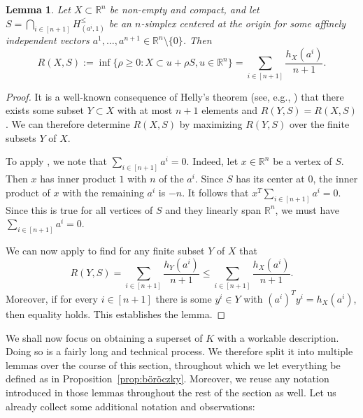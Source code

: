 \documentclass{amsart}
\newtheorem{lemma}[theorem]{Lemma}
\newcommand\R{\mathbb{R}}
\begin{document}
\begin{lemma}\label{lem:simplex_circumradius}
Let $X \subset \R^n$ be non-empty and compact,
and let $S = \bigcap_{i \in [n+1]} H_{(a^i,1)}^\leq$
be an $n$-simplex centered at the origin
for some affinely independent vectors $a^1, \dots, a^{n+1} \in \R^n \setminus \{0\}$.
Then
\[
    R(X,S)
    := \inf \{ \rho \geq 0 : X \subset u + \rho S, u \in \R^n \}
    = \sum_{i \in [n+1]} \frac{h_X(a^i)}{n+1}.
\]
\end{lemma}
\begin{proof}
It is a well-known consequence of Helly's theorem (see, e.g., \cite[Lemma~$2.2$]{2013:BrandenbergKönig}) that there exists some subset $Y \subset X$ with at most $n+1$ elements and $R(Y,S) = R(X,S)$.
We can therefore determine $R(X,S)$ by maximizing $R(Y,S)$ over the finite subsets $Y$ of $X$.

To apply \cite[Proposition~$6$]{2026:BryantTupper}, we note that $\sum_{i \in [n+1]} a^i = 0$.
Indeed, let $x \in \R^n$ be a vertex of $S$.
Then $x$ has inner product $1$ with $n$ of the $a^i$.
Since $S$ has its center at $0$,
the inner product of $x$ with the remaining $a^i$ is $-n$.
It follows that $x^T \sum_{i \in [n+1]} a^i = 0$.
Since this is true for all vertices of $S$ and they linearly span $\R^n$,
we must have $\sum_{i \in [n+1]} a^i = 0$.

We can now apply \cite[Proposition~$6$]{2026:BryantTupper} to find for any finite subset $Y$ of $X$ that
\[
    R(Y,S)
    = \sum_{i \in [n+1]} \frac{h_Y(a^i)}{n+1}
    \leq \sum_{i \in [n+1]} \frac{h_X(a^i)}{n+1}.
\]
Moreover, if for every $i \in [n+1]$ there is some $y^i \in Y$ with $(a^i)^T y^i = h_X(a^i)$, then equality holds.
This establishes the lemma.
\end{proof}



We shall now focus on obtaining a superset of $K$ with a workable description.
Doing so is a fairly long and technical process.
We therefore split it into multiple lemmas over the course of this section, 
throughout which we let everything be defined as in Proposition~\ref{prop:böröczky}.
Moreover, we reuse any notation introduced in those lemmas throughout the rest of the section as well.
Let us already
collect some additional notation and observations:
\end{document}
